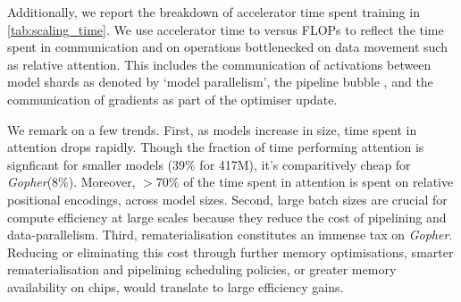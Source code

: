 \documentclass[11pt, a4paper, logo, internal, copyright, nonumbering]{deepmind}
\newcommand{\gopher}{\textit{Gopher}\xspace}
\begin{document}
Additionally, we report the breakdown of accelerator time spent training in \autoref{tab:scaling_time}. We use accelerator time to versus FLOPs to reflect the time spent in communication and on operations bottlenecked on data movement such as relative attention.
This includes the communication of activations between model shards as denoted by `model parallelism', the pipeline bubble \citep{huang2019gpipe}, and the communication of gradients as part of the optimiser update.

We remark on a few trends.
First, as models increase in size, time spent in attention drops rapidly. Though the fraction of time performing attention is signficant for smaller models (39\% for 417M), it's comparitively cheap for \gopher (8\%). Moreover, $>$70\% of the time spent in attention is spent on relative positional encodings, across model sizes.
Second, large batch sizes are crucial for compute efficiency at large scales because they reduce the cost of pipelining and data-parallelism.
Third, rematerialisation constitutes an immense tax on \gopher. Reducing or eliminating this cost through further memory optimisations, smarter rematerialisation and pipelining scheduling policies, or greater memory availability on chips, would translate to large efficiency gains.

\begin{table}
    \centering
    \caption{\textbf{Training Time Breakdown}. Percentage of the accelerator time spent on different tasks for various models, to the nearest percent. The \textit{Linears} category includes the attention query, key, value, and output projections. The \textit{Optimiser} category includes reducing the gradient across data-parallel workers, updating the parameters, and gathering the results across data-parallel workers. For 280B, we report the more efficient 6M token batch size; at 3M tokens the contribution of \textit{Pipelining} and \textit{Optimiser} are roughly doubled.}
    \label{tab:scaling_time}
\end{table}
\end{document}

